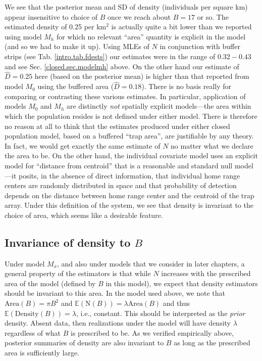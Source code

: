 We see that the posterior mean and SD of density (individuals per
square km) appear insensitive to choice of $B$ once we reach about
$B=17$ or so.  The estimated density of 0.25 per km$^2$ is actually
quite a bit lower than we reported using model $M_h$ for which no
relevant ``area'' quantity is explicit in the model (and so we had to
make it up).  Using MLEs of $N$ in conjunction with buffer strips (see
Tab.  \ref{intro.tab.fdests}) our estimates were in the range of
$0.32-0.43$ and see Sec.  \ref{closed.sec.modelmh} above.  On the
other hand our estimate of $\hat{D} = 0.25$ here (based on the
posterior mean) is higher than that reported from model $M_0$ using
the buffered area ($\hat{D} = 0.18$). There is no basis really for
comparing or contrasting these various estimates.  In particular,
application of models $M_0$ and $M_h$ are distinctly {\it not}
spatially explicit models---the area within which the population
resides is not defined under either model. There is therefore no
reason at all to think that the estimates produced under either closed
population model, based on a buffered ``trap area'', are justifiable
by any theory. In fact, we would get exactly the same estimate of $N$
no matter what we declare the area to be. On the other hand, the
individual covariate model uses an explicit model for ``distance from
centroid'' that is a reasonable and standard null model---it posits,
in the absence of direct information, that individual home range
centers are randomly distributed in space and that probability of
detection depends on the distance between home range center and the
centroid of the trap array. Under this definition of the system, we
see that density is invariant to the choice of area, which seems like
a desirable feature.


\subsection{Invariance of density to $B$}

Under model $M_{x}$, and also under models that we consider in later
chapters, a general property of the estimators is that while $N$
increases with the prescribed area of the model (defined by $B$ in
this model), we expect that density estimators should be invariant to
this area. In the model used above, we note that $\mbox{Area}(B) = \pi
B^{2}$ and $\mathbb{E}(\mbox{N}(B)) = \lambda \mbox{Area}(B)$ and thus
$\mathbb{E}(\mbox{Density}(B)) = \lambda$, i.e., constant. This should
be interpreted as the {\it prior} density. Absent data, then
realizations under the model will have density $\lambda$ regardless of
what $B$ is prescribed to be.  As we verified empirically above,
posterior summaries of density are also invariant to $B$ as long as
the prescribed area is sufficiently large.


